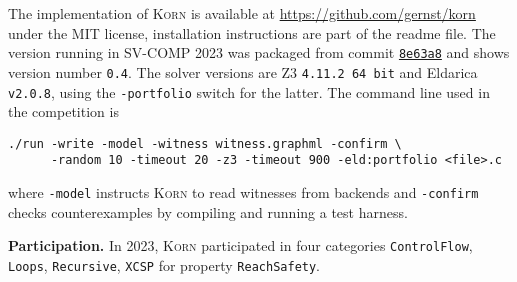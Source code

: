 \documentclass{llncs}
\newcommand{\Korn}{\textsc{Korn}\xspace}
\begin{document}
The implementation of \Korn is available at
    \url{https://github.com/gernst/korn} under the MIT license,
installation instructions are part of the readme file.
The version running in SV-COMP 2023 was packaged from commit
\href{https://github.com/gernst/korn/commit/8e968dd9e1498d358270d1e78d473befca8e63a8}{\tt 8e63a8}
and shows version number \texttt{0.4}.
The solver versions are Z3 \texttt{4.11.2 64 bit} and Eldarica \texttt{v2.0.8}, using the \texttt{-portfolio} switch for the latter.
The command line used in the competition is
\begin{verbatim}
./run -write -model -witness witness.graphml -confirm \
      -random 10 -timeout 20 -z3 -timeout 900 -eld:portfolio <file>.c
\end{verbatim}
where \texttt{-model} instructs \Korn to read witnesses from backends
and \texttt{-confirm} checks counterexamples
by compiling and running a test harness.

\smallskip

\textbf{Participation.} In 2023, \Korn participated in four categories
\texttt{ControlFlow},
\texttt{Loops},
\texttt{Recursive},
\texttt{XCSP}
for property \texttt{ReachSafety}.

% 
% 
% 
% 
% 
% 
% 
% 
% 
% 
% 
\end{document}
